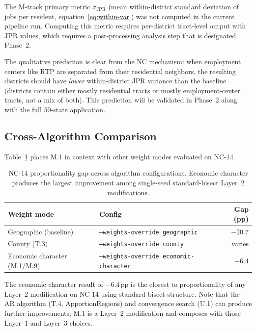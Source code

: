 The M-track primary metric $\overline{\sigma}_{\mathrm{JPR}}$ (mean within-district
standard deviation of jobs per resident, equation~\ref{eq:within-var}) was not
computed in the current pipeline run.
Computing this metric requires per-district tract-level output with JPR values,
which requires a post-processing analysis step that is designated Phase~2.

The qualitative prediction is clear from the NC mechanism:
when employment centers like RTP are separated from their residential neighbors,
the resulting districts should have \emph{lower} within-district JPR variance
than the baseline (districts contain either mostly residential tracts or mostly
employment-center tracts, not a mix of both).
This prediction will be validated in Phase~2 along with the full 50-state
application.

\subsection{Cross-Algorithm Comparison}

Table~\ref{tab:algorithm-comparison} places M.1 in context with other weight
modes evaluated on NC-14.

\begin{table}[ht]
\centering
\caption{NC-14 proportionality gap across algorithm configurations.
  Economic character produces the largest improvement among single-seed
  standard-bisect Layer~2 modifications.}
\label{tab:algorithm-comparison}
\begin{tabular}{llr}
  \toprule
  Weight mode & Config & Gap (pp) \\
  \midrule
  Geographic (baseline) & \texttt{--weights-override geographic} & $-$20.7 \\
  County (T.3) & \texttt{--weights-override county} & varies \\
  Economic character (M.1/M.9) & \texttt{--weights-override economic-character} & $-$6.4 \\
  \bottomrule
\end{tabular}
\end{table}

The economic character result of $-$6.4\,pp is the closest to proportionality
of any Layer~2 modification on NC-14 using standard-bisect structure.
Note that the AR algorithm (T.4, ApportionRegions) and convergence search
(U.1) can produce further improvements; M.1 is a Layer~2 modification and
composes with those Layer~1 and Layer~3 choices.
